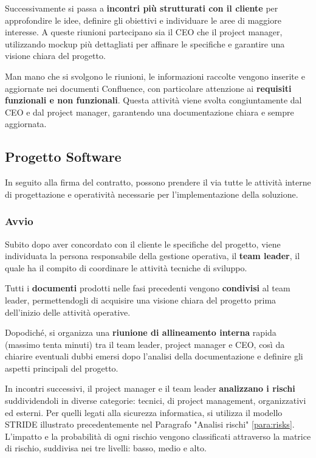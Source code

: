     Successivamente si passa a \textbf{incontri più strutturati con il cliente} per approfondire le idee, definire gli obiettivi
    e individuare le aree di maggiore interesse. A queste riunioni partecipano sia il CEO che il project
    manager, utilizzando mockup più dettagliati per affinare le specifiche e garantire una visione chiara del progetto.

    Man mano che si svolgono le riunioni, le informazioni raccolte vengono inserite e aggiornate nei documenti Confluence,
    con particolare attenzione ai \textbf{requisiti funzionali e non funzionali}. Questa attività viene svolta
    congiuntamente dal CEO e dal project manager, garantendo una documentazione chiara e sempre aggiornata.

    \subsection{Progetto Software}
    In seguito alla firma del contratto, possono prendere il via tutte le attività interne di progettazione e operatività necessarie per l'implementazione della soluzione.
    
    \subsubsection{Avvio}
    Subito dopo aver concordato con il cliente le specifiche del progetto, viene individuata la persona responsabile
    della gestione operativa, il \textbf{team leader}, il quale ha il compito di coordinare le attività tecniche di sviluppo.

    Tutti i \textbf{documenti} prodotti nelle fasi precedenti vengono \textbf{condivisi} al team leader, permettendogli di
    acquisire una visione chiara del progetto prima dell’inizio delle attività operative.

    Dopodiché, si organizza una \textbf{riunione di allineamento interna} rapida (massimo tenta minuti) tra il team leader,
    project manager e CEO, così da chiarire eventuali dubbi emersi dopo l’analisi della documentazione e definire gli aspetti principali del progetto.

    In incontri successivi, il project manager e il team leader \textbf{analizzano i rischi} suddividendoli in diverse categorie: tecnici,
    di project management, organizzativi ed esterni. Per quelli legati alla sicurezza informatica, si utilizza il modello STRIDE illustrato precedentemente
    nel Paragrafo "Analisi rischi" \ref{para:risks}.
    L’impatto e la probabilità di ogni rischio vengono classificati attraverso la matrice di rischio, suddivisa nei tre livelli: basso, medio e alto.

